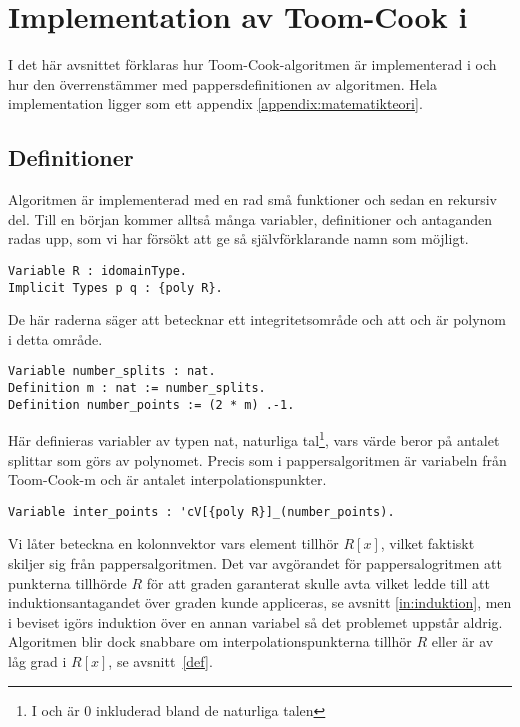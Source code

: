 \section{Implementation av Toom-Cook i \coq}
\label{sec:formellimplementation}
I det här avsnittet förklaras hur Toom-Cook-algoritmen är implementerad i \ssr
och hur den överrenstämmer med pappersdefinitionen av algoritmen. Hela
implementation ligger som ett appendix \ref{appendix:matematikteori}.

\subsection{Definitioner}
Algoritmen är implementerad med en rad små funktioner och sedan en rekursiv
del. Till en början kommer alltså många variabler, definitioner och antaganden
radas upp, som vi har försökt att ge så självförklarande namn som möjligt.

\begin{lstlisting}
Variable R : idomainType.
Implicit Types p q : {poly R}.
\end{lstlisting}

De här raderna säger att  betecknar ett integritetsområde och att 
och  är polynom i detta område.

\begin{lstlisting}
Variable number_splits : nat.
Definition m : nat := number_splits.
Definition number_points := (2 * m) .-1.
\end{lstlisting}

Här definieras variabler av typen nat, naturliga tal\footnote{I \coq och \ssr
är 0 inkluderad bland de naturliga talen}, vars värde beror på antalet splittar
som görs av polynomet. Precis som i pappersalgoritmen är  variabeln från
Toom-Cook-m och  är antalet interpolationspunkter.

\begin{lstlisting}
Variable inter_points : 'cV[{poly R}]_(number_points).
\end{lstlisting}

Vi låter  beteckna en kolonnvektor vars element tillhör $R[x]$,
vilket faktiskt skiljer sig från pappersalgoritmen. Det var avgörandet för
pappersalogritmen att punkterna tillhörde $R$ för att graden garanterat skulle
avta vilket ledde till att induktionsantagandet över graden kunde appliceras,
se avsnitt \ref{in:induktion}, men i beviset i\ssr görs induktion över en annan
variabel så det problemet uppstår aldrig. Algoritmen blir dock snabbare om
interpolationspunkterna tillhör $R$ eller är av låg grad i $R[x]$, se
avsnitt~\ref{def}.

